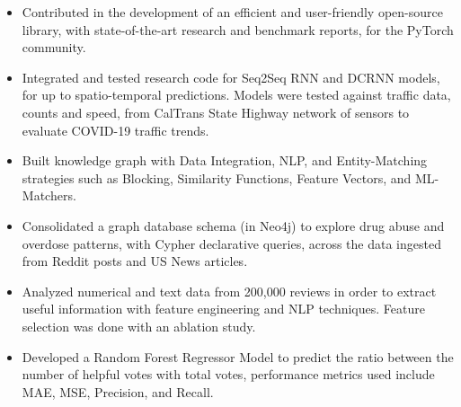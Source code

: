 \documentclass[10pt,a4paper]{altacv}
\begin{document}
\medskip





\begin{itemize}
  \item \small Contributed in the development of an efficient and user-friendly open-source library, with state-of-the-art research and benchmark reports, for the PyTorch community.
    \item \small Integrated and tested research code for Seq2Seq RNN and DCRNN models, for up to spatio-temporal predictions. Models were tested against traffic data, counts and speed, from CalTrans State Highway network of sensors to evaluate COVID-19 traffic trends. 
\end{itemize}

\medskip




\begin{itemize}
  \item \small Built knowledge graph with Data Integration, NLP, and Entity-Matching strategies such as Blocking, Similarity Functions, Feature Vectors, and ML-Matchers.
    \item \small Consolidated a graph database schema (in Neo4j) to explore drug abuse and overdose patterns, with Cypher declarative queries, across the data ingested from Reddit posts and US News articles. 
\end{itemize}

\medskip




\begin{itemize}
  \item \small Analyzed numerical and text data from 200,000 reviews in order to extract useful information with feature engineering and NLP techniques. Feature selection was done with an ablation study. 
    \item \small Developed a Random Forest Regressor Model to predict the ratio between the number of helpful votes with total votes, performance metrics used include MAE, MSE, Precision, and Recall. 
\end{itemize}
\end{document}
